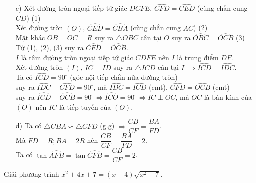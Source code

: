 \begin{ex}
{\begin{enumerate}
\item[c)] Xét đường tròn ngoại tiếp tứ giác $DCFE$, $\widehat{CFD}=\widehat{CED}$ (cùng chắn cung $CD$) \hfill (1)\\
Xét đường tròn $(O)$, $\widehat{CED}=\widehat{CBA}$  (cùng chắn cung $AC$) \hfill (2)\\
Mặt khác $OB=OC=R$ suy ra $\triangle OBC$ cân tại $O$ suy ra $\widehat{OBC}=\widehat{OCB}$ \hfill (3)\\
Từ (1), (2), (3) suy ra $\widehat{CFD}=\widehat{OCB}$.\\
$I$ là tâm đường tròn ngoại tiếp tứ giác $CDFE$ nên $I$ là trung điểm $DF$.\\
Xét đường tròn $(I)$, $IC=ID$ suy ra $\triangle ICD$ cân tại $I$ $\Rightarrow \widehat{ICD}=\widehat{IDC}$.\\
Ta có $\widehat{ICD}=90^\circ$ (góc nội tiếp chắn nửa đường tròn)\\
suy ra $\widehat{IDC}+\widehat{CFD}=90^\circ$, mà $\widehat{IDC}=\widehat{ICD}$ (cmt), $\widehat{CFD}=\widehat{OCB}$ (cmt)\\
suy ra $\widehat{ICD}+\widehat{OCB}=90^\circ \Leftrightarrow \widehat{ICO}=90^\circ \Leftrightarrow IC \perp OC$, mà $OC$ là bán kính của $(O)$ nên $IC$ là tiếp tuyến của $(O)$.
\item[d)]  Ta có $\triangle CBA \backsim \triangle CFD$ (g.g) $\Rightarrow \dfrac{CB}{CF}=\dfrac{BA}{FD}$.\\
Mà $FD=R; BA=2R$ nên $\dfrac{CB}{CF}=\dfrac{BA}{FD}=2$.\\
Ta có $\tan \widehat{AFB}=\tan \widehat{CFB}=\dfrac{CB}{CF}=2$.
\end{enumerate}
}
\end{ex}  



\begin{ex}%
Giải phương trình $x^2+4x+7=(x+4)\sqrt{x^2+7}$.
\end{ex}  
